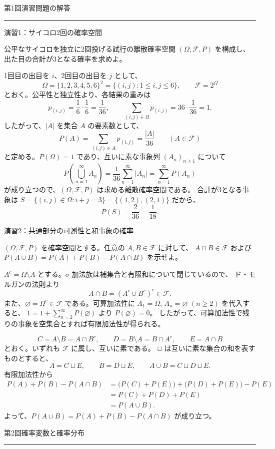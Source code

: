 \documentclass[a4paper,10pt,pdflatex,ja=standard,jafont=ipaex-type1,
  magstyle=real,scale=1]{bxjsarticle}
\newcommand{\coursename}{確率論と統計学 I}
\newcommand{\topic}[1]{\par\vspace{5pt}
  {\large\sffamily\mdseries\color{accent}#1}\par\vspace{2pt}}
\newcommand{\handouttitle}[1]{%
  \begin{center}
    {\Large\color{ink}#1}\par\vspace{3mm}
    {\color{accent}\rule{0.88\linewidth}{0.7pt}}
  \end{center}\vspace{-2mm}}
\newcommand{\keybox}[1]{\par\vspace{3pt}\begingroup
  \setlength{\fboxsep}{5pt}
  \colorbox{soft}{\parbox{\dimexpr\linewidth-2\fboxsep\relax}{#1}}%
  \endgroup\par\vspace{2pt}}
\newcommand{\F}{\mathcal F}
\begin{document}
\fontsize{10pt}{13.5pt}\selectfont
\begingroup
\fancyhead[L]{\small\color{ink}\coursename{}・前回の演習解答}
\handouttitle{第1回\quad 演習問題の解答}

\topic{演習1：サイコロ2回の確率空間}
\keybox{公平なサイコロを独立に2回投げる試行の離散確率空間
$(\Omega,\F,P)$ を構成し、出た目の合計が3となる確率を求めよ。}

1回目の出目を $i$、2回目の出目を $j$ として、
$$
  \Omega=\{1,2,3,4,5,6\}^2
    =\{(i,j):1\le i,j\le6\},\qquad \F=2^\Omega
$$
とおく。公平性と独立性より、各結果の重みは
$$
  p_{(i,j)}=\frac16\cdot\frac16=\frac1{36},\qquad
  \sum_{(i,j)\in\Omega}p_{(i,j)}=36\cdot\frac1{36}=1.
$$
したがって、$|A|$ を集合 $A$ の要素数として、
$$
  P(A)=\sum_{(i,j)\in A}p_{(i,j)}=\frac{|A|}{36}
  \qquad(A\in\F)
$$
と定める。$P(\Omega)=1$ であり、互いに素な事象列 $(A_n)_{n\ge1}$ について
$$
  P\!\left(\bigcup_{n=1}^\infty A_n\right)
  =\frac1{36}\sum_{n=1}^\infty|A_n|
  =\sum_{n=1}^\infty P(A_n)
$$
が成り立つので、$(\Omega,\F,P)$ は求める離散確率空間である。
合計が3となる事象は $S=\{(i,j)\in\Omega:i+j=3\}=\{(1,2),(2,1)\}$ だから、
$$
  {P(S)=\frac2{36}=\frac1{18}}.
$$

\topic{演習2：共通部分の可測性と和事象の確率}
\keybox{$(\Omega,\F,P)$ を確率空間とする。任意の $A,B\in\F$ に対して、
$A\cap B\in\F$ および $P(A\cup B)=P(A)+P(B)-P(A\cap B)$ を示せよ。}

$A^c=\Omega\setminus A$ とする。$\sigma$-加法族は補集合と有限和について閉じているので、
ド・モルガンの法則より
$$
  A\cap B=(A^c\cup B^c)^c\in\F.
$$
また、$\varnothing=\Omega^c\in\F$ である。可算加法性に
$A_1=\Omega$, $A_n=\varnothing$ $(n\ge2)$ を代入すると、
$1=1+\sum_{n=2}^\infty P(\varnothing)$ より $P(\varnothing)=0$。
したがって、可算加法性で残りの事象を空集合とすれば有限加法性が得られる。

$$
  C=A\setminus B=A\cap B^c,\qquad
  D=B\setminus A=B\cap A^c,\qquad E=A\cap B
$$
とおく。いずれも $\F$ に属し、互いに素である。
$\sqcup$ は互いに素な集合の和を表すものとすると、
$$
  A=C\sqcup E,\qquad B=D\sqcup E,\qquad
  A\cup B=C\sqcup D\sqcup E.
$$
有限加法性から
$$
  \begin{aligned}
    P(A)+P(B)-P(A\cap B)
      &=\bigl(P(C)+P(E)\bigr)+\bigl(P(D)+P(E)\bigr)-P(E)\\
      &=P(C)+P(D)+P(E)\\
      &=P(A\cup B).
  \end{aligned}
$$
よって、${P(A\cup B)=P(A)+P(B)-P(A\cap B)}$ が成り立つ。
\clearpage
\endgroup

\handouttitle{第2回\quad 確率変数と確率分布}
\end{document}
